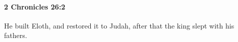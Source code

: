 
		\paragraph{2 Chronicles 26:2} %
			\label{2CHRONICLES-26-2}

			He built Eloth, and restored it to Judah, after that the king slept with his fathers.


